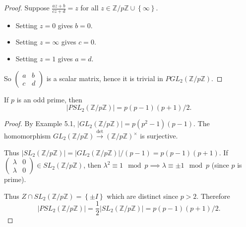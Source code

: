 \documentclass[a4paper]{scrartcl}
\begin{document}
\begin{proof}
      Suppose $\frac{az+b}{cz+d}=z$ for all $z \in \mathbb{Z}/p\mathbb{Z} \cup \left\{ \infty\right\}$. 
      \begin{itemize}
           \item Setting $z=0$ gives $b=0$.
           \item Setting $z= \infty$ gives $c=0$.
           \item Setting $z=1$ gives $a=d$.
      \end{itemize}
      So $\begin{pmatrix} a&b\\c&d \end{pmatrix}$ is a scalar matrix, hence it is trivial in $PGL_{2}(\mathbb{Z}/p\mathbb{Z}) $.
\end{proof}
\begin{lemma}
      If $p$ is an odd prime, then \[
      |PSL_{2}(\mathbb{Z}/p\mathbb{Z})|=p (p-1)(p+1)/2
      .\] 
\end{lemma}
\begin{proof}
      By Example 5.1, $|GL_2 (\mathbb{Z}/p\mathbb{Z})|=p (p^2-1)(p-1)$. The homomorphism $GL_2 (\mathbb{Z}/p\mathbb{Z}) \xrightarrow{\operatorname{det}} (\mathbb{Z}/p\mathbb{Z})^{\times}$ is surjective.
      
      Thus $|SL_2 (\mathbb{Z}/p\mathbb{Z})|=|GL_2 (\mathbb{Z}/p\mathbb{Z})|/(p-1)=p (p-1)(p+1)$. If $\begin{pmatrix} \lambda &0 \\ \lambda&0 \end{pmatrix} \in SL_2 (\mathbb{Z}/p\mathbb{Z})$, then $\lambda^2 \equiv 1 \mod p \implies \lambda \equiv \pm 1 \mod p$ (since $p$ is prime). 

      Thus $Z \cap SL_2 (\mathbb{Z}/p\mathbb{Z})=\left\{\pm I\right\}$ which are distinct since $p>2$. Therefore \[
          |PSL_2 (\mathbb{Z}/p\mathbb{Z})|=\frac{1}{2}|SL_2 (\mathbb{Z}/p\mathbb{Z})|=p (p-1)(p+1)/2
      .\] 
\end{proof}
\end{document}
